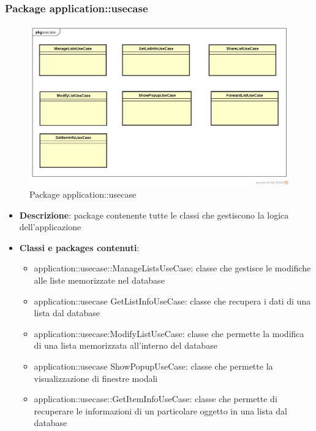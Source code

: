 \subsubsection{Package application::usecase}
\label{Package application::usecase}
\begin{figure}[H]
	\centering
	\includegraphics[scale=0.5]{Sezioni/Packages/Application/usecase.png}
	\caption{Package application::usecase}
\end{figure}
\begin{itemize}
	\item \textbf{Descrizione}: package contenente tutte le classi che gestiscono la logica dell'applicazione
	\item \textbf{Classi e packages contenuti}:
	\begin{itemize}
	\item application::usecase::ManageListsUseCase: classe che gestisce le modifiche alle liste memorizzate nel database
	\item application::usecase GetListInfoUseCase: classe che recupera i dati di una lista dal database
	\item application::usecase:ModifyListUseCase: classe che permette la modifica di una lista memorizzata all'interno del database
	\item application::usecase ShowPopupUseCase: classe che permette la visualizzazione di finestre modali
	\item application::usecase::GetItemInfoUseCase: classe che permette di recuperare le informazioni di un particolare oggetto in una lista dal database
	\end{itemize}
\end{itemize}


